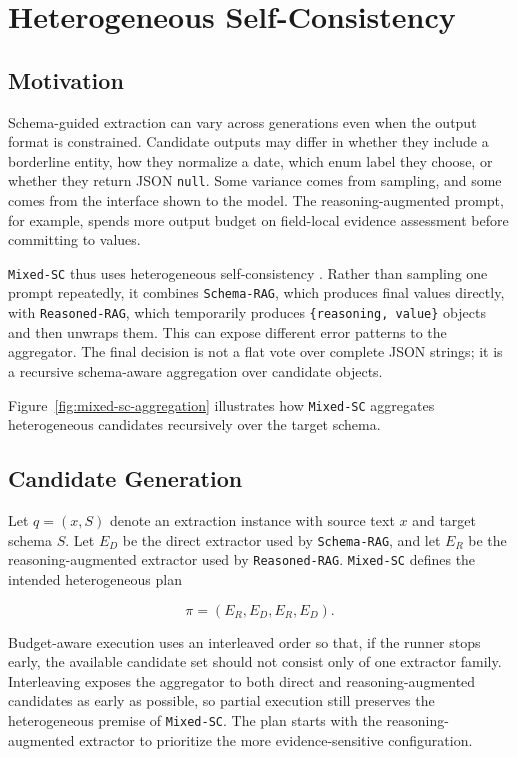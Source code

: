 \section{Heterogeneous Self-Consistency}

\subsection{Motivation}

Schema-guided extraction can vary across generations even when the output format is constrained. Candidate outputs may differ in whether they include a borderline entity, how they normalize a date, which enum label they choose, or whether they return JSON \texttt{null}. Some variance comes from sampling, and some comes from the interface shown to the model. The reasoning-augmented prompt, for example, spends more output budget on field-local evidence assessment before committing to values.

\texttt{Mixed-SC} thus uses heterogeneous self-consistency \cite{wang2022selfconsistency}. Rather than sampling one prompt repeatedly, it combines \texttt{Schema-RAG}, which produces final values directly, with \texttt{Reasoned-RAG}, which temporarily produces \texttt{\{reasoning, value\}} objects and then unwraps them. This can expose different error patterns to the aggregator. The final decision is not a flat vote over complete JSON strings; it is a recursive schema-aware aggregation over candidate objects.

Figure~\ref{fig:mixed-sc-aggregation} illustrates how \texttt{Mixed-SC} aggregates heterogeneous candidates recursively over the target schema.



\FloatBarrier

\subsection{Candidate Generation}

Let \(q=(x,S)\) denote an extraction instance with source text \(x\) and target schema \(S\). Let \(E_D\) be the direct extractor used by \texttt{Schema-RAG}, and let \(E_R\) be the reasoning-augmented extractor used by \texttt{Reasoned-RAG}. \texttt{Mixed-SC} defines the intended heterogeneous plan

\[
\pi=(E_R,E_D,E_R,E_D).
\]

Budget-aware execution uses an interleaved order so that, if the runner stops early, the available candidate set should not consist only of one extractor family. Interleaving exposes the aggregator to both direct and reasoning-augmented candidates as early as possible, so partial execution still preserves the heterogeneous premise of \texttt{Mixed-SC}. The plan starts with the reasoning-augmented extractor to prioritize the more evidence-sensitive configuration.

